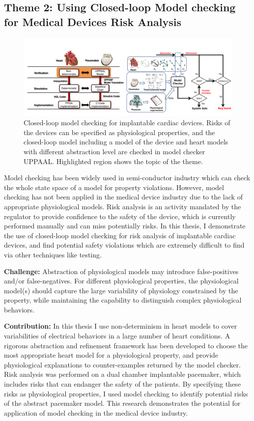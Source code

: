 \documentclass[a4paper,11pt]{article}
\begin{document}
\subsection{Theme 2: Using Closed-loop Model checking for Medical Devices Risk Analysis}
\begin{figure}[t]
	\centering
	\includegraphics[scale=0.32]{figs/mb_mc.pdf}
	\caption{\small Closed-loop model checking for implantable cardiac devices. Risks of the devices can be specified as physiological properties, and the closed-loop model including a model of the device and heart models with different abstraction level are checked in model checker UPPAAL. Highlighted region shows the topic of the theme.}
	\label{fig:mb_mc}
\end{figure}
Model checking has been widely used in semi-conductor industry which can check the whole state space of a model for property violations.
However, model checking has not been applied in the medical device industry due to the lack of appropriate physiological models.
Risk analysis is an activity mandated by the regulator to provide confidence to the safety of the device, which is currently performed manually and can miss potentially risks.
In this thesis, I demonstrate the use of closed-loop model checking for risk analysis of implantable cardiac devices, and find potential safety violations which are extremely difficult to find via other techniques like testing.

\noindent\textbf{Challenge:} Abstraction of physiological models may introduce false-positives and/or false-negatives. For different physiological properties, the physiological model(s) should capture the large variability of physiology constrained by the property, while maintaining the capability to distinguish complex physiological behaviors.

\noindent\textbf{Contribution:}
In this thesis I use non-determinism in heart models to cover variabilities of electrical behaviors in a large number of heart conditions.
A rigorous abstraction and refinement framework has been developed to choose the most appropriate heart model for a physiological property, and provide physiological explanations to counter-examples returned by the model checker.
Risk analysis was performed on a dual chamber implantable pacemaker, which includes risks that can endanger the safety of the patients.
By specifying these risks as physiological properties, I used model checking to identify potential risks of the abstract pacemaker model.
This research demonstrates the potential for application of model checking in the medical device industry.
\end{document}
